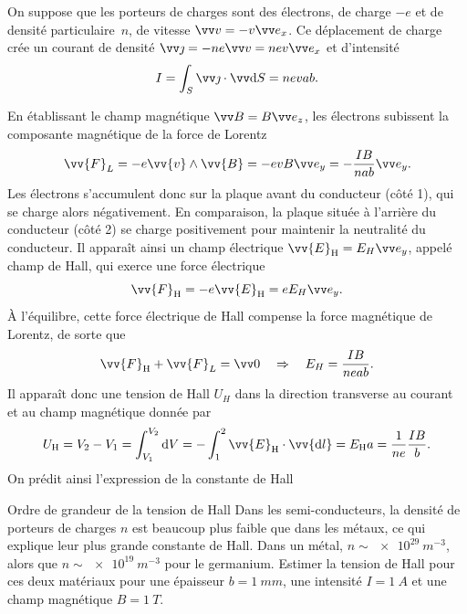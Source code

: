 \documentclass[12pt,fancy]{cours}%
\begin{document}
On suppose que les porteurs de charges sont des électrons, de charge $-e$ et de densité particulaire~$n$, de vitesse $\Vec{v} = -v \ex$. Ce déplacement de charge crée un courant de densité $\j = -ne \Vec{v} = nev \ex$ et d'intensité
\begin{equation}
  I = \int_S \j \ps \dS = nevab.
\end{equation}

En établissant le champ magnétique $\B = B \ez$, les électrons subissent la composante magnétique de la force de Lorentz
\begin{equation}
  \vv{F}_L=-e\vv{v}\pv\vv{B} = -evB \ey = -\frac{IB}{nab} \ey.
\end{equation}
Les électrons s'accumulent donc sur la plaque avant du conducteur (côté 1), qui se charge alors négativement. En comparaison, la plaque située à l'arrière du conducteur (côté 2) se charge positivement pour maintenir la neutralité du conducteur. Il apparaît ainsi un champ électrique $\vv{E}_{\rm{H}} = E_H \ey$, appelé champ de Hall, qui exerce une force électrique
\begin{equation}
  \vv{F}_{\rm{H}}=-e\vv{E}_{\rm{H}} = eE_H \ey.
\end{equation}
À l'équilibre, cette force électrique de Hall compense la force magnétique de Lorentz, de sorte que
\begin{equation}
    \vv{F}_{\rm{H}} + \vv{F}_L = \Vec{0} \Rar E_H = \frac{IB}{neab}.
\end{equation}
 Il apparaît donc une tension de Hall $U_H$ dans la direction transverse au courant et au champ magnétique donnée par
\begin{equation}
  U_{\rm{H}}=V_2-V_1=\int_{V_1}^{V_2}\d V=-\int_{1}^{2}\vv{E}_{\rm{H}}\cdot\vv{\d l} = E_{\rm{H}}a = \frac{1}{ne} \frac{IB}{b}.
\end{equation}
On prédit ainsi l'expression de la constante de Hall
\begin{exemple}{Ordre de grandeur de la tension de Hall}
  Dans les semi-conducteurs, la densité de porteurs de charges $n$ est beaucoup plus faible que dans les métaux, ce qui explique leur plus grande constante de Hall. Dans un métal, $n \sim \SI{e29}{m^{-3}}$, alors que $n \sim \SI{e19}{m^{-3}}$ pour le germanium. Estimer la tension de Hall pour ces deux matériaux pour une épaisseur $b = \SI{1}{mm}$, une intensité $I=\SI{1}{A}$ et une champ magnétique $B=\SI{1}{T}$. 
\end{exemple}
\end{document}
